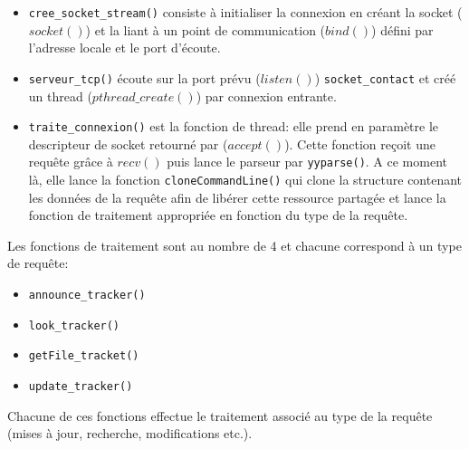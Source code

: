 \begin{itemize} 
\item \texttt{cree\_socket\_stream()} consiste à initialiser la connexion en créant la socket ($socket()$) et la liant à un point de communication ($bind()$) défini par l'adresse locale et le port d'écoute. 
\item \texttt{serveur\_tcp()} écoute sur la port prévu ($listen()$) \texttt{socket\_contact} et créé un thread ($pthread\_create()$) par connexion entrante. 
\item \texttt{traite\_connexion()} est la fonction de thread: elle prend en paramètre le descripteur de socket retourné par ($accept()$). Cette fonction reçoit une requête grâce à $recv()$ puis lance le parseur par \texttt{yyparse()}. A ce moment là, elle lance la fonction \texttt{cloneCommandLine()} qui clone la structure contenant les données de la requête afin de libérer cette ressource partagée et lance la fonction de traitement appropriée en fonction du type de la requête. 
\end{itemize} 
 
Les fonctions de traitement sont au nombre de 4 et chacune correspond à un type de requête: 
 
\begin{itemize} 
\item \texttt{announce\_tracker()} 
\item \texttt{look\_tracker()} 
\item \texttt{getFile\_tracket()} 
\item \texttt{update\_tracker()} 
\end{itemize} 
 
Chacune de ces fonctions effectue le traitement associé au type de la requête (mises à jour, recherche, modifications etc.).         

